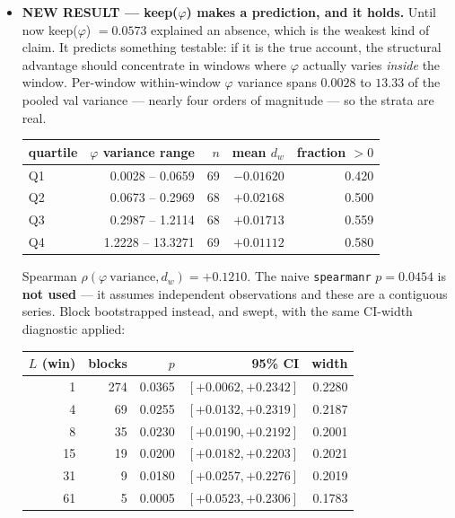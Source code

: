 \documentclass[11pt,a4paper]{article}
\newcommand{\code}[1]{\texttt{\small #1}}
\begin{document}
\begin{itemize}
\item \textbf{NEW RESULT --- keep($\varphi$) makes a prediction, and it holds.}
Until now keep($\varphi$) $= 0.0573$ explained an absence, which is the weakest
kind of claim. It predicts something testable: if it is the true account, the
structural advantage should concentrate in windows where $\varphi$ actually
varies \emph{inside} the window. Per-window within-window $\varphi$ variance
spans $0.0028$ to $13.33$ of the pooled val variance --- nearly four orders of
magnitude --- so the strata are real.

\begin{center}
\begin{tabular}{lrrrr}
\toprule
quartile & $\varphi$ variance range & $n$ & mean $d_w$ & fraction $>0$ \\
\midrule
Q1 & 0.0028 -- 0.0659 & 69 & $-0.01620$ & 0.420 \\
Q2 & 0.0673 -- 0.2969 & 68 & $+0.02168$ & 0.500 \\
Q3 & 0.2987 -- 1.2114 & 68 & $+0.01713$ & 0.559 \\
Q4 & 1.2228 -- 13.3271 & 69 & $+0.01112$ & 0.580 \\
\bottomrule
\end{tabular}
\end{center}

Spearman $\rho(\varphi\ \text{variance}, d_w) = \mathbf{+0.1210}$. The naive
\code{spearmanr} $p = 0.0454$ is \textbf{not used} --- it assumes independent
observations and these are a contiguous series. Block bootstrapped instead,
and swept, with the same CI-width diagnostic applied:

\begin{center}
\begin{tabular}{rrrrr}
\toprule
$L$ (win) & blocks & $p$ & 95\% CI & width \\
\midrule
1  & 274 & 0.0365 & $[+0.0062, +0.2342]$ & 0.2280 \\
4  &  69 & 0.0255 & $[+0.0132, +0.2319]$ & 0.2187 \\
8  &  35 & 0.0230 & $[+0.0190, +0.2192]$ & 0.2001 \\
15 &  19 & 0.0200 & $[+0.0182, +0.2203]$ & 0.2021 \\
31 &   9 & 0.0180 & $[+0.0257, +0.2276]$ & 0.2019 \\
61 &   5 & 0.0005 & $[+0.0523, +0.2306]$ & 0.1783 \\
\bottomrule
\end{tabular}
\end{center}


\end{itemize}
\end{document}

